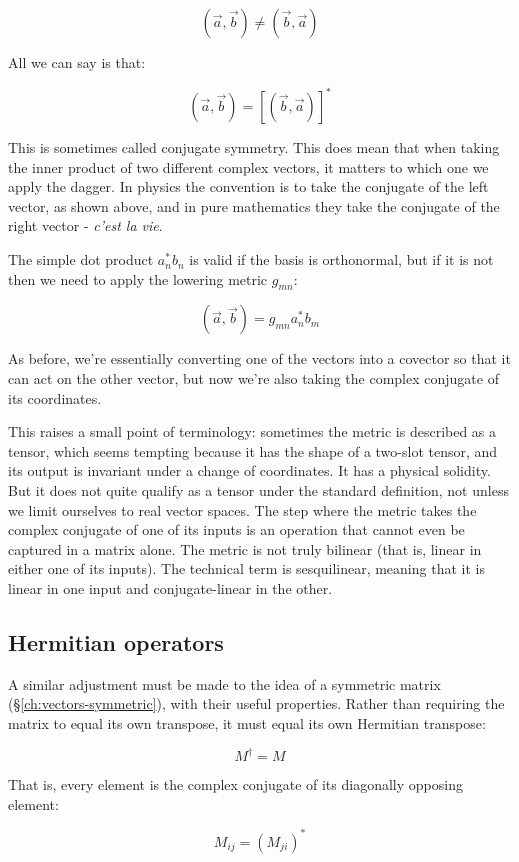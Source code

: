 $$
(\vec{a}, \vec{b})
\ne
(\vec{b}, \vec{a})
$$

All we can say is that:

$$
(\vec{a}, \vec{b})
=
\left[ (\vec{b}, \vec{a}) \right]^*
$$

This is sometimes called conjugate symmetry. This does mean that when taking the inner product of two different complex vectors, it matters to which one we apply the dagger. In physics the convention is to take the conjugate of the left vector, as shown above, and in pure mathematics they take the conjugate of the right vector - \textit{c'est la vie}.

The simple dot product $a_n^* b_n$ is valid if the basis is orthonormal, but if it is not then we need to apply the lowering metric $g_{mn}$:

$$
(\vec{a}, \vec{b})
=
g_{mn} a_n^* b_m
$$

As before, we're essentially converting one of the vectors into a covector so that it can act on the other vector, but now we're also taking the complex conjugate of its coordinates.

This raises a small point of terminology: sometimes the metric is described as a tensor, which seems tempting because it has the shape of a two-slot tensor, and its output is invariant under a change of coordinates. It has a physical solidity. But it does not quite qualify as a tensor under the standard definition, not unless we limit ourselves to real vector spaces. The step where the metric takes the complex conjugate of one of its inputs is an operation that cannot even be captured in a matrix alone. The metric is not truly bilinear (that is, linear in either one of its inputs). The technical term is sesquilinear, meaning that it is linear in one input and conjugate-linear in the other.

\subsection{Hermitian operators}

A similar adjustment must be made to the idea of a symmetric matrix (§\ref{ch:vectors-symmetric}), with their useful properties. Rather than requiring the matrix to equal its own transpose, it must equal its own Hermitian transpose:

$$M^\dagger = M$$

That is, every element is the complex conjugate of its diagonally opposing element:

$$M_{ij} = (M_{ji})^*$$

